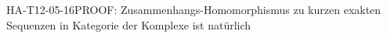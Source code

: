 
\begin{REM}{HA-T12-05-16}{PROOF: Zusammenhangs-Homomorphismus zu kurzen exakten Sequenzen in Kategorie der Komplexe ist natürlich}
\end{REM}
